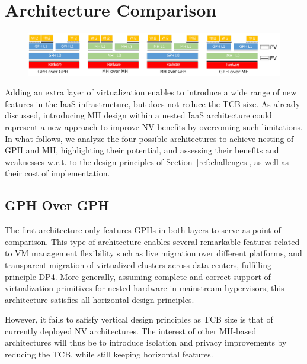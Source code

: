 \documentclass{sig-alternate}
\begin{document}
\section{Architecture Comparison}
\label{sec:archcomp}

\begin{figure}
\begin{center}
\includegraphics[width=2\columnwidth]{globalcut.png}
\end{center}
\caption{}
\label{fig:io}
\end{figure}

\noindent Adding an extra layer of virtualization enables to introduce a wide range of new features in the IaaS infrastructure, but does not reduce the TCB size. As already discussed, introducing MH design within a nested IaaS architecture could represent a new approach to improve NV benefits by overcoming such limitations. In what follows, we analyze the four possible architectures to achieve nesting of GPH and MH, highlighting their potential, and assessing their benefits and weaknesses w.r.t. to the design principles of Section~\ref{ref:challenges}, as well as their cost of implementation.

\subsection{GPH Over GPH}

\noindent The first architecture only features GPHs in both layers to serve as point of comparison. This type of architecture enables several remarkable features related to VM management flexibility such as live migration over different platforms, and transparent migration of virtualized clusters across data centers, fulfilling principle DP4. More generally, assuming complete and correct support of virtualization primitives for nested hardware in mainstream hypervisors, this architecture satisfies all horizontal design principles. 

However, it fails to safisfy vertical design principles as TCB size is that of currently deployed NV architectures. The interest of other MH-based architectures will thus be to introduce isolation and privacy improvements by reducing the TCB, while still keeping horizontal features.
\end{document}
